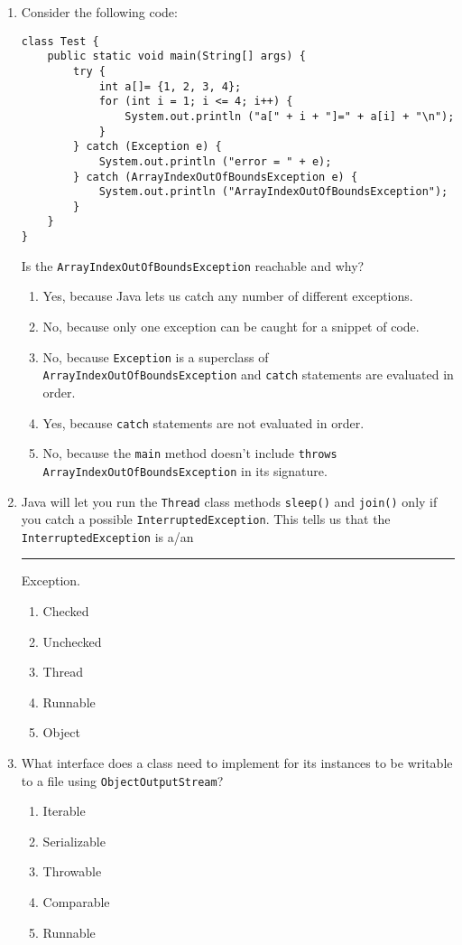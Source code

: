 \documentclass[CS180-S16-FinalExam.tex]{subfiles}
\begin{document}
\begin{enumerate}
\clearpage
\item Consider the following code:
\begin{lstlisting}
class Test {
    public static void main(String[] args) {
        try {
            int a[]= {1, 2, 3, 4};
            for (int i = 1; i <= 4; i++) {
                System.out.println ("a[" + i + "]=" + a[i] + "\n");
            }
        } catch (Exception e) {
            System.out.println ("error = " + e);
        } catch (ArrayIndexOutOfBoundsException e) {
            System.out.println ("ArrayIndexOutOfBoundsException");
        }
    }
}
\end{lstlisting}
Is the \texttt{ArrayIndexOutOfBoundsException} reachable and why?
\begin{enumerate}
\item Yes, because Java lets us catch any number of different exceptions.
\item No, because only one exception can be caught for a snippet of code.
\item No, because \texttt{Exception} is a superclass of
\texttt{ArrayIndexOutOfBoundsException} and \texttt{catch} statements are evaluated in order. \ifdraft \Ans \fi
\item Yes, because \texttt{catch} statements are not evaluated in order. 
\item No, because the \texttt{main} method doesn't include \texttt{throws ArrayIndexOutOfBoundsException} in its signature. 
\end{enumerate}

\item Java will let you run the \texttt{Thread} class methods \texttt{sleep()} and \texttt{join()} only if you catch a possible \texttt{InterruptedException}. This tells us that the \texttt{InterruptedException} is a/an \noindent\rule{3cm}{0.4pt} Exception.
\begin{enumerate}
\item Checked \ifdraft \Ans \fi
\item Unchecked
\item Thread
\item Runnable
\item Object
\end{enumerate}

\item What interface does a class need to implement for its instances to be writable to a file using \texttt{ObjectOutputStream}?
\begin{enumerate}
\item Iterable
\item Serializable \ifdraft \Ans \fi
\item Throwable
\item Comparable
\item Runnable
\end{enumerate}


\end{enumerate}
\end{document}
